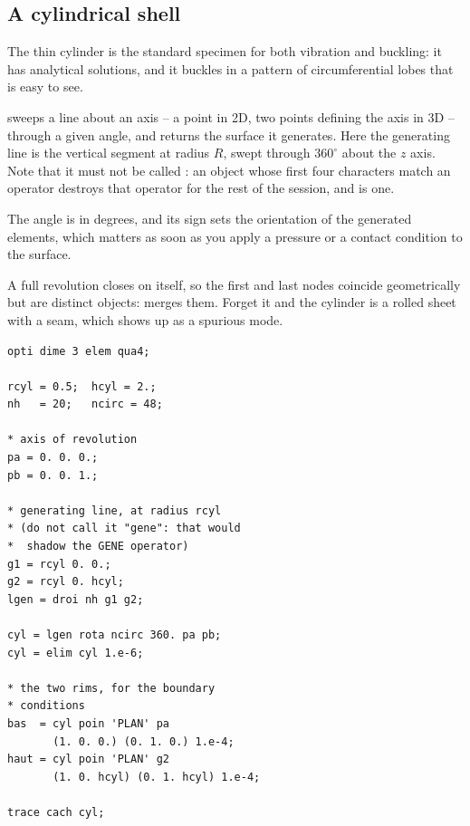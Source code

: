\subsection*{A cylindrical shell}

The thin cylinder is the standard specimen for both vibration and buckling: it
has analytical solutions, and it buckles in a pattern of circumferential
lobes that is easy to see.

\begin{castemcom}
 
 sweeps a line about an
axis -- a point in 2D, two points defining the axis in 3D -- through a given
angle, and returns the surface it generates. Here the generating line is the
vertical segment  at radius $R$, swept through $360^{\circ}$ about
the $z$ axis. Note that it must not be called : an object whose
first four characters match an operator destroys that operator for the rest
of the session, and  is one.

The angle is in degrees, and its sign sets the orientation of the generated
elements, which matters as soon as you apply a pressure or a contact
condition to the surface.

\medskip
A full revolution closes on itself, so the first and last nodes coincide
geometrically but are distinct objects:  merges them. Forget it and
the cylinder is a rolled sheet with a seam, which shows up as a spurious
mode.
\end{castemcom}
\begin{castemlines}
\begin{verbatim}
opti dime 3 elem qua4;

rcyl = 0.5;  hcyl = 2.;
nh   = 20;   ncirc = 48;

* axis of revolution
pa = 0. 0. 0.;
pb = 0. 0. 1.;

* generating line, at radius rcyl
* (do not call it "gene": that would
*  shadow the GENE operator)
g1 = rcyl 0. 0.;
g2 = rcyl 0. hcyl;
lgen = droi nh g1 g2;

cyl = lgen rota ncirc 360. pa pb;
cyl = elim cyl 1.e-6;

* the two rims, for the boundary
* conditions
bas  = cyl poin 'PLAN' pa
       (1. 0. 0.) (0. 1. 0.) 1.e-4;
haut = cyl poin 'PLAN' g2
       (1. 0. hcyl) (0. 1. hcyl) 1.e-4;

trace cach cyl;
\end{verbatim}
\end{castemlines}

